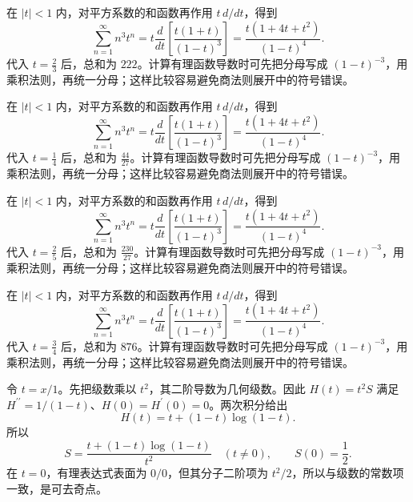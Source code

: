 \documentclass[UTF8,12pt,a4paper,fontset=fandol]{ctexart}
\begin{document}
\begin{solve}\label{ans:c27q9}
在 $|t|<1$ 内，对平方系数的和函数再作用 $t\,d/dt$，得到
\[
\sum_{n=1}^\infty n^3t^n=t\frac d{dt}\left[\frac{t(1+t)}{(1-t)^3}\right]=\frac{t(1+4t+t^2)}{(1-t)^4}.
\]
代入 $t=\frac{2}{3}$ 后，总和为 $222$。计算有理函数导数时可先把分母写成 $(1-t)^{-3}$，用乘积法则，再统一分母；这样比较容易避免商法则展开中的符号错误。
\end{solve}

\begin{solve}\label{ans:c27q10}
在 $|t|<1$ 内，对平方系数的和函数再作用 $t\,d/dt$，得到
\[
\sum_{n=1}^\infty n^3t^n=t\frac d{dt}\left[\frac{t(1+t)}{(1-t)^3}\right]=\frac{t(1+4t+t^2)}{(1-t)^4}.
\]
代入 $t=\frac{1}{4}$ 后，总和为 $\frac{44}{27}$。计算有理函数导数时可先把分母写成 $(1-t)^{-3}$，用乘积法则，再统一分母；这样比较容易避免商法则展开中的符号错误。
\end{solve}

\begin{solve}\label{ans:c27q11}
在 $|t|<1$ 内，对平方系数的和函数再作用 $t\,d/dt$，得到
\[
\sum_{n=1}^\infty n^3t^n=t\frac d{dt}\left[\frac{t(1+t)}{(1-t)^3}\right]=\frac{t(1+4t+t^2)}{(1-t)^4}.
\]
代入 $t=\frac{2}{5}$ 后，总和为 $\frac{230}{27}$。计算有理函数导数时可先把分母写成 $(1-t)^{-3}$，用乘积法则，再统一分母；这样比较容易避免商法则展开中的符号错误。
\end{solve}

\begin{solve}\label{ans:c27q12}
在 $|t|<1$ 内，对平方系数的和函数再作用 $t\,d/dt$，得到
\[
\sum_{n=1}^\infty n^3t^n=t\frac d{dt}\left[\frac{t(1+t)}{(1-t)^3}\right]=\frac{t(1+4t+t^2)}{(1-t)^4}.
\]
代入 $t=\frac{3}{4}$ 后，总和为 $876$。计算有理函数导数时可先把分母写成 $(1-t)^{-3}$，用乘积法则，再统一分母；这样比较容易避免商法则展开中的符号错误。
\end{solve}

\begin{solve}\label{ans:c27q13}
令 $t=x/1$。先把级数乘以 $t^2$，其二阶导数为几何级数。因此 $H(t)=t^2S$ 满足 $H^{\prime\prime}=1/(1-t)$、$H(0)=H^{\prime}(0)=0$。两次积分给出
\[
H(t)=t+(1-t)\log(1-t).
\]
所以
\[
S=\frac{t+(1-t)\log(1-t)}{t^2}\quad(t\ne0),\qquad S(0)=\frac12.
\]
在 $t=0$，有理表达式表面为 $0/0$，但其分子二阶项为 $t^2/2$，所以与级数的常数项一致，是可去奇点。
\end{solve}
\end{document}
